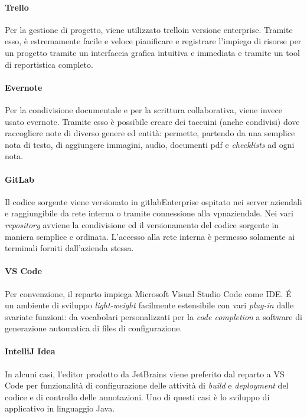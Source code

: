 \paragraph{Trello}
Per la gestione di progetto, viene utilizzato \gls{trello}\glsfirstoccur in versione enterprise. Tramite esso, è estremamente facile e veloce pianificare e registrare l'impiego di risorse per un progetto tramite un interfaccia grafica intuitiva e immediata e tramite un tool di reportistica completo.

\paragraph{Evernote}Per la condivisione documentale e per la scrittura collaborativa, viene invece usato \gls{evernote}\glsfirstoccur. Tramite esso è possibile creare dei taccuini (anche condivisi) dove raccogliere note di diverso genere ed entità: permette, partendo da una semplice nota di testo, di aggiungere immagini, audio, documenti pdf e \textit{checklists} ad ogni nota.


\paragraph{GitLab}Il codice sorgente viene versionato in \gls{gitlab}\glsfirstoccur Enterprise ospitato nei server aziendali e raggiungibile da rete interna o tramite connessione alla \acrshort{vpn}\glsfirstoccur aziendale. Nei vari \textit{repository} avviene la condivisione ed il versionamento del codice sorgente in maniera semplice e ordinata.
L'accesso alla rete interna è permesso solamente ai terminali forniti dall'azienda stessa.

\paragraph{VS Code} Per convenzione, il reparto impiega Microsoft Visual Studio Code come IDE. \'E un ambiente di sviluppo \textit{light-weight} facilmente estensibile con vari \textit{plug-in} dalle svariate funzioni: da vocabolari personalizzati per la \textit{code completion} a software di generazione automatica di files di configurazione.

\paragraph{IntelliJ Idea} In alcuni casi, l'editor prodotto da JetBrains viene preferito dal reparto a VS Code per funzionalità di configurazione delle attività di \textit{build} e \textit{deployment} del codice e di controllo delle annotazioni. Uno di questi casi è lo sviluppo di applicativo in linguaggio Java.


